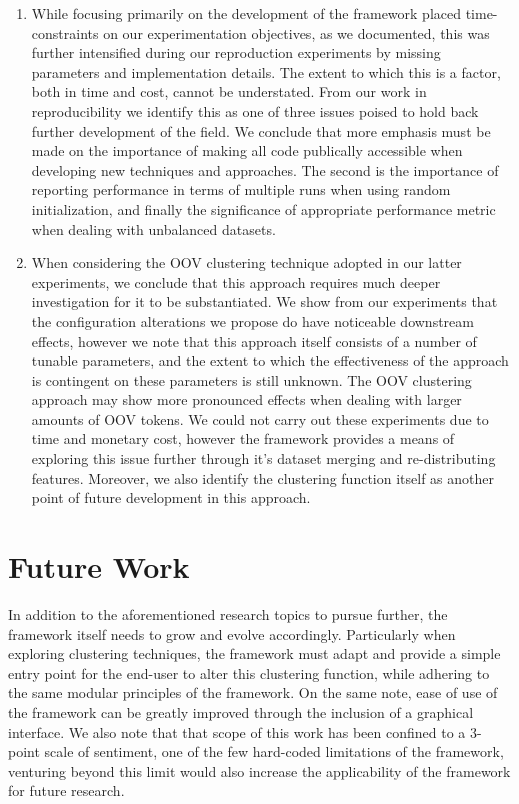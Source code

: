 \documentclass[../../fyp.tex]{subfiles}
\begin{document}
\begin{enumerate}
	\item While focusing primarily on the development of the framework placed time-constraints on our experimentation objectives, as we documented, this was further intensified during our reproduction experiments by missing parameters and implementation details. The extent to which this is a factor, both in time and cost, cannot be understated. From our work in reproducibility we identify this as one of three issues poised to hold back further development of the field. We conclude that more emphasis must be made on the importance of making all code publically accessible when developing new techniques and approaches. The second is the importance of reporting performance in terms of multiple runs when using random initialization, and finally the significance of appropriate performance metric when dealing with unbalanced datasets. 
	\item When considering the OOV clustering technique adopted in our latter experiments, we conclude that this approach requires much deeper investigation for it to be substantiated. We show from our experiments that the configuration alterations we propose do have noticeable downstream effects, however we note that this approach itself consists of a number of tunable parameters, and the extent to which the effectiveness of the approach is contingent on these parameters is still unknown. The OOV clustering approach may show more pronounced effects when dealing with larger amounts of OOV tokens. We could not carry out these experiments due to time and monetary cost, however the framework provides a means of exploring this issue further through it's dataset merging and re-distributing features. Moreover, we also identify the clustering function itself as another point of future development in this approach. 
\end{enumerate}

\section{Future Work}
In addition to the aforementioned research topics to pursue further, the framework itself needs to grow and evolve accordingly. Particularly when exploring clustering techniques, the framework must adapt and provide a simple entry point for the end-user to alter this clustering function, while adhering to the same modular principles of the framework. On the same note, ease of use of the framework can be greatly improved through the inclusion of a graphical interface. We also note that that scope of this work has been confined to a 3-point scale of sentiment, one of the few hard-coded limitations of the framework, venturing beyond this limit would also increase the applicability of the framework for future research. 
\end{document}
